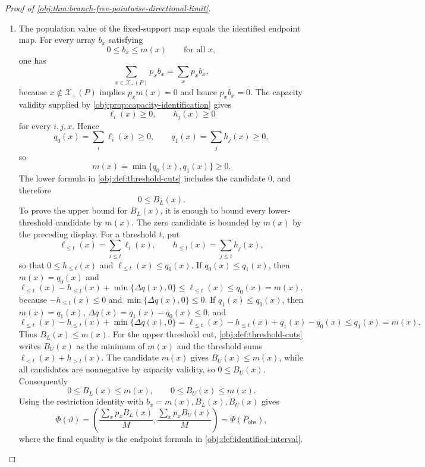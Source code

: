 \begin{proof}[Proof of \cref{obj:thm:branch-free-pointwise-directional-limit}]
\begin{enumerate}
\item The population value of the fixed-support map equals the identified endpoint map. For every array \(b_x\) satisfying
\[
0\le b_x\le m(x)\qquad\text{for all }x,
\]
one has
\[
\sum_{x\in\mathcal X_+(P)}p_xb_x=\sum_xp_xb_x,
\]
because \(x\notin\mathcal X_+(P)\) implies \(p_xm(x)=0\) and hence \(p_xb_x=0\). The capacity validity supplied by \cref{obj:prop:capacity-identification} gives
\[
\ell_i(x)\ge0,\qquad h_j(x)\ge0
\]
for every \(i,j,x\). Hence
\[
q_0(x)=\sum_i\ell_i(x)\ge0,\qquad
q_1(x)=\sum_j h_j(x)\ge0,
\]
so
\[
m(x)=\min\{q_0(x),q_1(x)\}\ge0.
\]
The lower formula in \cref{obj:def:threshold-cuts} includes the candidate \(0\), and therefore
\[
0\le B_L(x).
\]
To prove the upper bound for \(B_L(x)\), it is enough to bound every lower-threshold candidate by \(m(x)\). The zero candidate is bounded by \(m(x)\) by the preceding display. For a threshold \(t\), put
\[
\ell_{\le t}(x)=\sum_{i\le t}\ell_i(x),\qquad
h_{\le t}(x)=\sum_{j\le t}h_j(x),
\]
so that \(0\le h_{\le t}(x)\) and \(\ell_{\le t}(x)\le q_0(x)\). If \(q_0(x)\le q_1(x)\), then \(m(x)=q_0(x)\) and
\[
\ell_{\le t}(x)-h_{\le t}(x)+\min\{\Delta q(x),0\}
\le
\ell_{\le t}(x)
\le q_0(x)=m(x),
\]
because \(-h_{\le t}(x)\le0\) and \(\min\{\Delta q(x),0\}\le0\). If \(q_1(x)\le q_0(x)\), then \(m(x)=q_1(x)\), \(\Delta q(x)=q_1(x)-q_0(x)\le0\), and
\[
\ell_{\le t}(x)-h_{\le t}(x)+\min\{\Delta q(x),0\}
=
\ell_{\le t}(x)-h_{\le t}(x)+q_1(x)-q_0(x)
\le q_1(x)=m(x).
\]
Thus \(B_L(x)\le m(x)\). For the upper threshold cut, \cref{obj:def:threshold-cuts} writes \(B_U(x)\) as the minimum of \(m(x)\) and the threshold sums \(\ell_{<t}(x)+h_{>t}(x)\). The candidate \(m(x)\) gives \(B_U(x)\le m(x)\), while all candidates are nonnegative by capacity validity, so \(0\le B_U(x)\). Consequently
\[
0\le B_L(x)\le m(x),\qquad 0\le B_U(x)\le m(x).
\]
Using the restriction identity with \(b_x=m(x),B_L(x),B_U(x)\) gives
\[
\Phi(\vartheta)
=
\left(
\frac{\sum_xp_xB_L(x)}{M},
\frac{\sum_xp_xB_U(x)}{M}
\right)
=
\Psi(P_{\mathrm{obs}}),
\]
where the final equality is the endpoint formula in \cref{obj:def:identified-interval}. %


\end{enumerate}
\end{proof}
